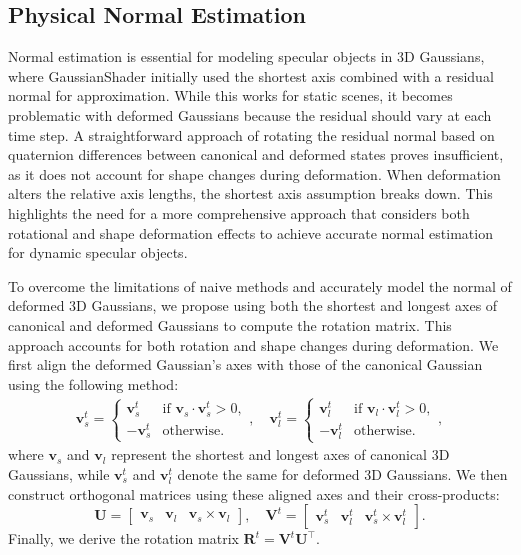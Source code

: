 

\subsection{Physical Normal Estimation}
\label{sec:Normal Estimation}
Normal estimation is essential for modeling specular objects in 3D Gaussians, where GaussianShader \citep{jiang2023gaussianshader} initially used the shortest axis combined with a residual normal for approximation. While this works for static scenes, it becomes problematic with deformed Gaussians because the residual should vary at each time step. A straightforward approach of rotating the residual normal based on quaternion differences between canonical and deformed states proves insufficient, as it does not account for shape changes during deformation. When deformation alters the relative axis lengths, the shortest axis assumption breaks down. This highlights the need for a more comprehensive approach that considers both rotational and shape deformation effects to achieve accurate normal estimation for dynamic specular objects.

\vspace{3pt}  
To overcome the limitations of naive methods and accurately model the normal of deformed 3D Gaussians, we propose using both the shortest and longest axes of canonical and deformed Gaussians to compute the rotation matrix. This approach accounts for both rotation and shape changes during deformation.
We first align the deformed Gaussian's axes with those of the canonical Gaussian using the following method:
\begin{align}
\mathbf{v}_s^t =
\begin{cases}
\mathbf{v}_s^t & \text{if } \mathbf{v}_s \cdot \mathbf{v}_s^t > 0, \\
-\mathbf{v}_s^t & \text{otherwise.}
\end{cases}
, \quad
\mathbf{v}_l^t =
\begin{cases}
\mathbf{v}_l^t & \text{if } \mathbf{v}_l \cdot \mathbf{v}_l^t > 0, \\
-\mathbf{v}_l^t & \text{otherwise.}
\end{cases},
\end{align}
where $\mathbf{v}_s$ and $\mathbf{v}_l$ represent the shortest and longest axes of canonical 3D Gaussians, while $\mathbf{v}_s^t$ and $\mathbf{v}_l^t$ denote the same for deformed 3D Gaussians. We then construct orthogonal matrices using these aligned axes and their cross-products:
\begin{equation}
\mathbf{U} = \begin{bmatrix} \mathbf{v}_s & \mathbf{v}_l & \mathbf{v}_s \times  \mathbf{v}_l \end{bmatrix},
\quad
\mathbf{V}^t = \begin{bmatrix} \mathbf{v}_s^t & \mathbf{v}_l^t & \mathbf{v}_s^t \times \mathbf{v}_l^t \end{bmatrix}.
\end{equation}
Finally, we derive the rotation matrix $\mathbf{R}^t = \mathbf{V}^t \mathbf{U}^\top.$

